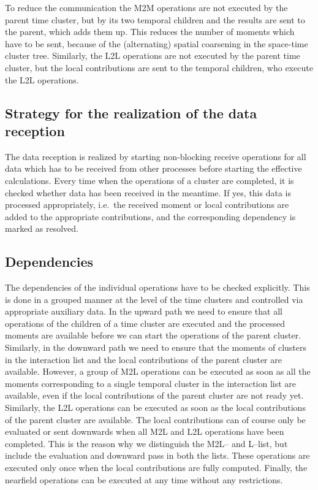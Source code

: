 \documentclass[a4paper,11pt]{article}
\theoremstyle{plain}
\theoremstyle{definition}
\theoremstyle{remark}
\begin{document}
To reduce the communication the M2M operations are not executed by the parent time cluster, but by its two temporal children and the results are sent to the parent, which adds them up. This reduces the number of moments which have to be sent, because of the (alternating) spatial coarsening in the space-time cluster tree. Similarly, the L2L operations are not executed by the parent time cluster, but the local contributions are sent to the temporal children, who execute the L2L operations.

\subsection{Strategy for the realization of the data reception}
The data reception is realized by starting non-blocking receive operations for all data which has to be received from other processes before starting the effective calculations. Every time when the operations of a cluster are completed, it is checked whether data has been received in the meantime. If yes, this data is processed appropriately, i.e.~the received moment or local contributions are added to the appropriate contributions, and the corresponding dependency is marked as resolved.

\subsection{Dependencies} \label{sec:dependencies}
The dependencies of the individual operations have to be checked explicitly. This is done in a grouped manner at the level of the time clusters and controlled via appropriate auxiliary data. In the upward path we need to ensure that all operations of the children of a time cluster are executed and the processed moments are available before we can start the operations of the parent cluster. Similarly, in the downward path we need to ensure that the moments of clusters in the interaction list and the local contributions of the parent cluster are available. However, a group of M2L operations can be executed as soon as all the moments corresponding to a single temporal cluster in the interaction list are available, even if the local contributions of the parent cluster are not ready yet. Similarly, the L2L operations can be executed as soon as the local contributions of the parent cluster are available. The local contributions can of course only be evaluated or sent downwards when all M2L and L2L operations have been completed. This is the reason why we distinguish the M2L-- and L--list, but include the evaluation and downward pass in both the lists. These operations are executed only once when the local contributions are fully computed. Finally, the nearfield operations can be executed at any time without any restrictions.
\end{document}
